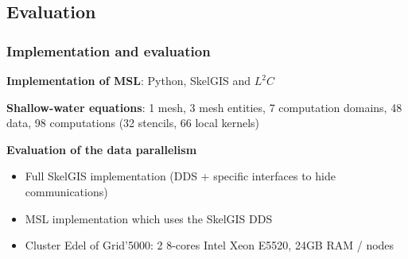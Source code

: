 \documentclass{beamer}
\begin{document}
\subsection{Evaluation}
\begin{frame}
\frametitle{Implementation and evaluation}
\textbf{Implementation of MSL}: Python, SkelGIS and $L^2C$

\medskip
\textbf{Shallow-water equations}: 1 mesh, 3 mesh entities, 7 computation domains, 48 data, 98 computations (32 stencils, 66 local kernels)

\medskip
\textbf{Evaluation of the data parallelism}
\begin{itemize}
\item Full SkelGIS implementation (DDS + specific interfaces to hide communications)
\item MSL implementation which uses the SkelGIS DDS
\item Cluster Edel of Grid'5000: 2 8-cores Intel Xeon E5520, 24GB RAM / nodes
\end{itemize}
\end{frame}
\end{document}
